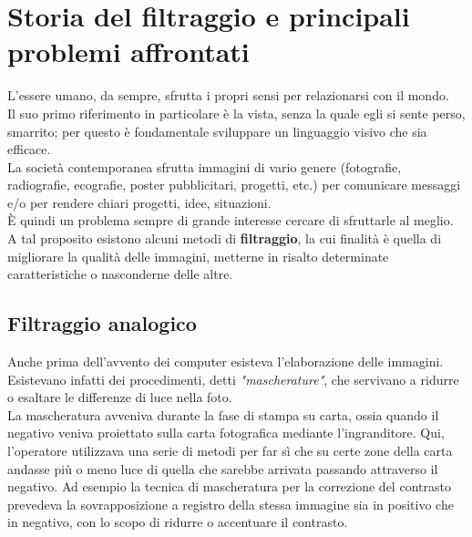 \section{Storia del filtraggio e principali problemi affrontati}

L'essere umano, da sempre, sfrutta i propri sensi per relazionarsi con il mondo.\\
Il suo primo riferimento in particolare è la vista, senza la quale egli si sente perso, smarrito; per questo è fondamentale sviluppare un linguaggio  visivo che sia efficace.\\
La società contemporanea sfrutta immagini di vario genere (fotografie, radiografie, ecografie, poster pubblicitari, progetti, etc.) per comunicare messaggi e/o per rendere chiari progetti, idee, situazioni.\\
\`E quindi un problema sempre di grande interesse cercare di sfruttarle al meglio. A tal proposito esistono alcuni metodi di \textbf{filtraggio}, la cui finalità è quella di migliorare la qualità delle immagini, metterne in risalto determinate caratteristiche o nasconderne delle altre.\\


\subsection{Filtraggio analogico}
Anche prima dell'avvento dei computer esisteva l'elaborazione delle immagini. Esistevano infatti dei procedimenti, detti \textit{"mascherature"}, che servivano a ridurre o esaltare le differenze di luce nella foto.\\
La mascheratura avveniva durante la fase di stampa su carta, ossia quando il negativo veniva proiettato sulla carta fotografica mediante l’ingranditore. 
Qui, l'operatore utilizzava una serie di metodi per far sì che su certe zone della carta andasse più o meno luce di quella che sarebbe arrivata passando attraverso il negativo.
Ad esempio la tecnica di mascheratura per la correzione del contrasto prevedeva la sovrapposizione a registro della stessa immagine sia in positivo che in negativo, con lo scopo di ridurre o accentuare il contrasto.
\newpage

